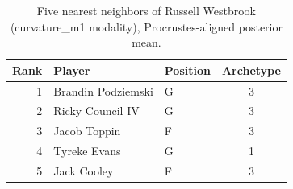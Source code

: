 \begin{table}[htbp]
  \centering\small
  \begin{tabular}{rllc}
    \toprule
    Rank & Player & Position & Archetype \\
    \midrule
    1 & Brandin Podziemski & G & 3 \\
    2 & Ricky Council IV & G & 3 \\
    3 & Jacob Toppin & F & 3 \\
    4 & Tyreke Evans & G & 1 \\
    5 & Jack Cooley & F & 3 \\
    \bottomrule
  \end{tabular}
  \caption{Five nearest neighbors of Russell Westbrook (curvature_m1 modality), Procrustes-aligned posterior mean.}
  \label{tab:Russell_Westbrook_neighbors_curvature_m1}
\end{table}

